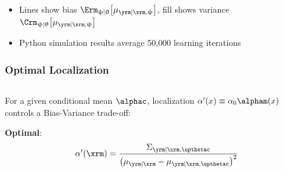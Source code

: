 \documentclass[aspectratio=169]{beamer}
\begin{document}
\begin{frame}
\begin{columns}[c]
\begin{column}{.5\linewidth}
\end{column}

\end{columns}

\vspace{-1em}
\begin{itemize}
\item Lines show bias $\Erm_{\uppsi | \uptheta}\big[\mu_{\yrm | \xrm, \uppsi}\big]$, fill shows variance $\Crm_{\uppsi | \uptheta}\big[\mu_{\yrm | \xrm, \uppsi}\big]$
\item Python simulation results average 50,000 learning iterations
\end{itemize}

\end{frame}




\begin{frame}
\frametitle{Optimal Localization}

\begin{columns}[c]

\begin{column}{.5\linewidth}

For a given conditional mean $\alphac$, localization $\alpha'(x) \equiv \alpha_0 \alpham(x)$ controls a \alert{Bias-Variance} trade-off:
\vspace{-1em}
\begin{table}
\renewcommand{\arraystretch}{1.8}
\end{table}

\vspace{.5em}
\textbf{Optimal}: 
\vspace{-.5em}
\begin{equation*} \label{eq:alpha_x_min_Rex}
	\alpha'(\xrm) = \frac{\Sigma_{\yrm | \xrm,\upthetac}}{\left( \mu_{\yrm | \xrm} - \mu_{\yrm | \xrm,\upthetac} \right)^2}
\end{equation*}

\end{column}


\end{columns}
\end{frame}
\end{document}
